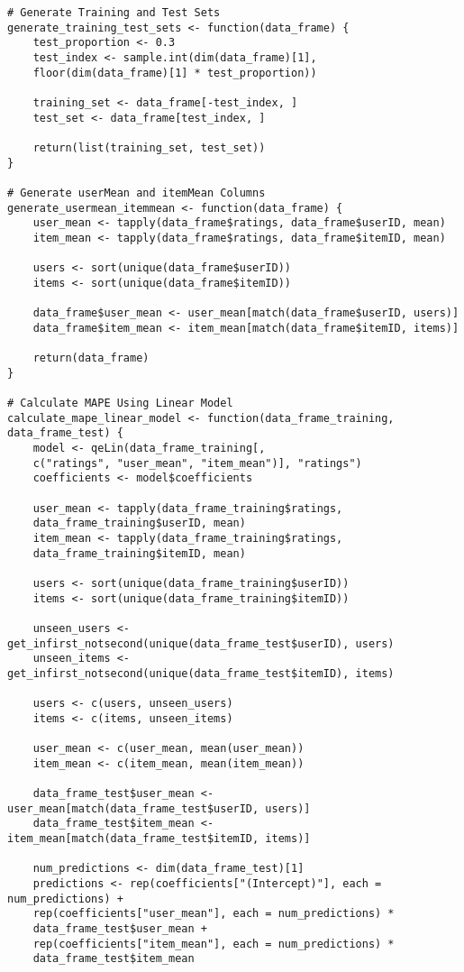 \documentclass[12pt]{article}
\begin{document}
\begin{singlespace}
\begin{verbatim}
# Generate Training and Test Sets
generate_training_test_sets <- function(data_frame) {
    test_proportion <- 0.3
    test_index <- sample.int(dim(data_frame)[1],
    floor(dim(data_frame)[1] * test_proportion))

    training_set <- data_frame[-test_index, ]
    test_set <- data_frame[test_index, ]

    return(list(training_set, test_set))
}

# Generate userMean and itemMean Columns
generate_usermean_itemmean <- function(data_frame) {
    user_mean <- tapply(data_frame$ratings, data_frame$userID, mean)
    item_mean <- tapply(data_frame$ratings, data_frame$itemID, mean)

    users <- sort(unique(data_frame$userID))
    items <- sort(unique(data_frame$itemID))

    data_frame$user_mean <- user_mean[match(data_frame$userID, users)]
    data_frame$item_mean <- item_mean[match(data_frame$itemID, items)]

    return(data_frame)
}

# Calculate MAPE Using Linear Model
calculate_mape_linear_model <- function(data_frame_training, data_frame_test) {
    model <- qeLin(data_frame_training[,
    c("ratings", "user_mean", "item_mean")], "ratings")
    coefficients <- model$coefficients

    user_mean <- tapply(data_frame_training$ratings,
    data_frame_training$userID, mean)
    item_mean <- tapply(data_frame_training$ratings,
    data_frame_training$itemID, mean)

    users <- sort(unique(data_frame_training$userID))
    items <- sort(unique(data_frame_training$itemID))

    unseen_users <- get_infirst_notsecond(unique(data_frame_test$userID), users)
    unseen_items <- get_infirst_notsecond(unique(data_frame_test$itemID), items)

    users <- c(users, unseen_users)
    items <- c(items, unseen_items)

    user_mean <- c(user_mean, mean(user_mean))
    item_mean <- c(item_mean, mean(item_mean))

    data_frame_test$user_mean <- user_mean[match(data_frame_test$userID, users)]
    data_frame_test$item_mean <- item_mean[match(data_frame_test$itemID, items)]

    num_predictions <- dim(data_frame_test)[1]
    predictions <- rep(coefficients["(Intercept)"], each = num_predictions) +
    rep(coefficients["user_mean"], each = num_predictions) *
    data_frame_test$user_mean +
    rep(coefficients["item_mean"], each = num_predictions) *
    data_frame_test$item_mean


\end{verbatim}
\end{singlespace}
\end{document}
